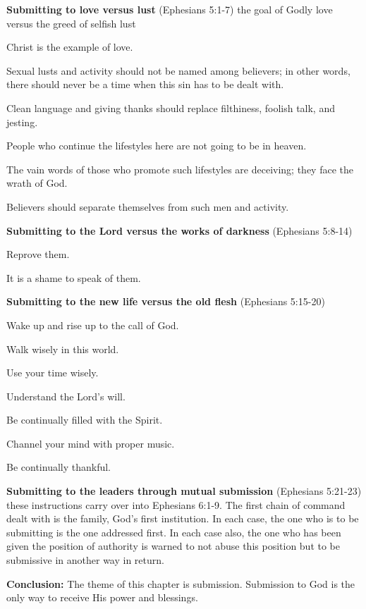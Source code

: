 \begin{compactenum}[I.]
    \item \textbf{Submitting to love versus lust}  (Ephesians 5:1-7) the goal of Godly love versus the greed of selfish lust
    \begin{compactenum}[A.]
    	\item Christ is the example of love.
    	\item Sexual lusts and activity should not be named among believers; in other words, there should never be a time when this sin has to be dealt with.
    	\item Clean language and giving thanks should replace filthiness, foolish talk, and jesting.
    	\item People who continue the lifestyles here are not going to be in heaven.
    	\item The vain words of those who promote such lifestyles are deceiving; they face the wrath of God.
    	\item Believers should separate themselves from such men and activity.
    \end{compactenum}
    \item \textbf{Submitting to the Lord versus the works of darkness}  (Ephesians 5:8-14) 
    \begin{compactenum}[A.]
    	\item Reprove them.
    	\item It is a shame to speak of them.
    \end{compactenum}
    \item \textbf{Submitting to the new life versus the old flesh}  (Ephesians 5:15-20) 
    \begin{compactenum}[A.]
    	\item Wake up and rise up to the call of God.
    	\item Walk wisely in this world.
    	\item Use your time wisely.
    	\item Understand the Lord’s will.
    	\item Be continually filled with the Spirit.
    	\item Channel your mind with proper music.
    	\item Be continually thankful.
    \end{compactenum}
    \item \textbf{Submitting to the leaders through mutual submission}  (Ephesians 5:21-23) these instructions carry over into  Ephesians 6:1-9. The first chain of command dealt with is the family, God’s first institution. In each case, the one who is to be submitting is the one addressed first. In each case also, the one who has been given the position of authority is warned to not abuse this position but to be submissive in another way in return.
\end{compactenum}
\textbf{Conclusion:} The theme of this chapter is submission. Submission to God is the only way to receive His power and blessings.
